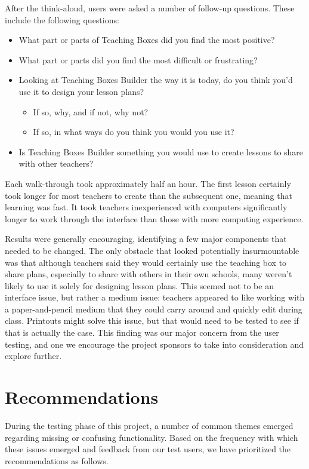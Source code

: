 \documentclass[10pt,letter]{article}
\begin{document}
After the think-aloud, users were asked a number of follow-up questions.  These include
the following questions:

\begin{itemize}
\item What part or parts of Teaching Boxes did you find the most positive?
\item What part or parts did you find the most difficult or frustrating?
\item Looking at Teaching Boxes Builder the way it is today, do you think you'd
      use it to design your lesson plans?
      \begin{itemize}
	  \item If so, why, and if not, why not?
	  \item If so, in what ways do you think you would you use it?
	  \end{itemize}
\item Is Teaching Boxes Builder something you would use to create lessons to
	  share with other teachers?
\end{itemize}

Each walk-through took approximately half an hour.  The first lesson certainly
took longer for most teachers to create than the subsequent one, meaning that
learning was fast.  It took teachers inexperienced with computers significantly
longer to work through the interface than those with more computing experience.

Results were generally encouraging, identifying a few major components that
needed to be changed.  The only obstacle that looked potentially insurmountable
was that although teachers said they would certainly use the teaching box to
share plans, especially to share with others in their own schools, many weren't
likely to use it solely for designing lesson plans.  This seemed not to be an
interface issue, but rather a medium issue: teachers appeared to like working
with a paper-and-pencil medium that they could carry around and quickly edit
during class.  Printouts might solve this issue, but that would need to be
tested to see if that is actually the case. This finding was our major concern
from the user testing, and one we encourage the project sponsors to take into
consideration and explore further.

\section{Recommendations}
During the testing phase of this project, a number of common themes emerged
regarding missing or confusing functionality. Based on the frequency with which
these issues emerged and feedback from our test users, we have prioritized the
recommendations as follows.
\end{document}

